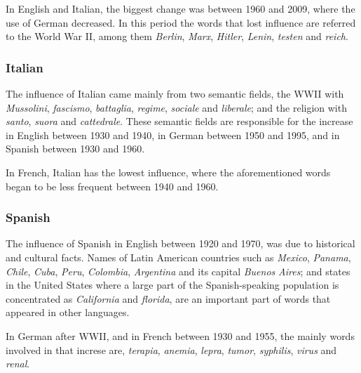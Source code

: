 \documentclass[10pt,letterpaper]{article} %
\begin{document}
In English and Italian, the biggest change was between 1960 and 2009, where the
use of German decreased. In this period the words that lost influence
 are
referred to the World War II, among them \textit{Berlin}, \textit{Marx},
\textit{Hitler}, \textit{Lenin}, \textit{testen}  and \textit{reich}.
\subsubsection*{Italian} %


The influence of Italian came mainly from two semantic fields, the WWII with
\textit{Mussolini}, \textit{fascismo}, \textit{battaglia}, \textit{regime},
\textit{sociale} and \textit{liberale}; and the religion with \textit{santo},
\textit{suora} and \textit{cattedrale}. These semantic fields are
responsible for the increase in English between 1930 and 1940, in German
between 1950 and 1995, and in Spanish between 1930 and 1960.

In French, Italian has the lowest influence, where the aforementioned words
began to be less frequent between 1940 and 1960.
\subsubsection*{Spanish} %

The influence of Spanish in English between 1920 and 1970, was due to
historical and cultural facts. Names of Latin American  countries such as
\textit{Mexico}, \textit{Panama}, \textit{Chile}, \textit{Cuba}, \textit{Peru},
\textit{Colombia}, \textit{Argentina} and its capital \textit{Buenos}
\textit{Aires};  and states in the United States  where a large part of the
Spanish-speaking population is concentrated as \textit{California} and
\textit{florida}, are an important part of words that appeared in 
other languages. 

In German after WWII, and in French between 1930 and 1955, the mainly words
involved in that increse are, \textit{terapia}, \textit{anemia},
\textit{lepra}, \textit{tumor}, \textit{syphilis}, \textit{virus} and
\textit{renal}. 
\end{document}
